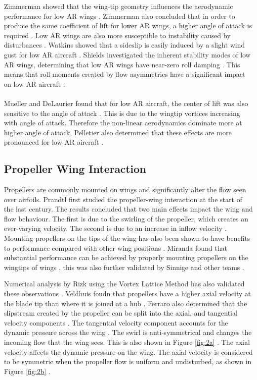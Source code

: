  Zimmerman showed that the wing-tip geometry influences the aerodynamic performance for low AR wings \cite{Zimmerman1936}. Zimmerman also concluded that in order to produce the same coefficient of lift for lower AR wings, a higher angle of attack is required \cite{Zimmerman1936}. Low AR wings are also more susceptible to instability caused by disturbances \cite{DeVoria2017}. Watkins showed that a sideslip is easily induced by a slight wind gust for low AR aircraft \cite{Watkins2012}. Shields investigated the inherent stability modes of low AR wings, determining that low AR wings have near-zero roll damping \cite{Shields2015}. This means that roll moments created by flow asymmetries have a significant impact on low AR aircraft \cite{Shields2015}.\\
 \\
 Mueller and DeLaurier found that for low AR aircraft, the center of lift was also sensitive to the angle of attack \cite{Mueller2003}. This is due to the wingtip vortices increasing with angle of attack. Therefore the non-linear aerodynamics dominate more at higher angle of attack, Pelletier also determined that these effects are more pronounced for low AR aircraft \cite{Pelletier2012}. 


\subsection{Propeller Wing Interaction}




Propellers are commonly mounted on wings and significantly alter the flow seen over airfoils. Prandtl first studied the propeller-wing interaction at the start of the last century. The results concluded that two main effects impact the wing and flow behaviour. The first is due to the swirling of the propeller, which creates an ever-varying velocity. The second is due to an increase in inflow velocity \cite{Pant}. Mounting propellers on the tips of the wing has also been shown to have benefits to performance compared with other wing positions \cite{Miranda1986} . Miranda found that substantial performance can be achieved by properly mounting propellers on the wingtips of wings \cite{Miranda1986}, this was also further validated by Sinnige \cite{Sinnige2019} and other teams \cite{Veldhuis2000} \cite{review}. 

Numerical analysis by Rizk using the Vortex Lattice Method has also validated these observations \cite{Rizk2012}. Veldhuis foudn that propellers have a higher axial velocity at the blade tip than where it is joined at a hub \cite{Veldhuis2000}. Ferraro also determined that the slipstream created by the propeller can be split into the axial, and tangential velocity components \cite{Ferraro2014}. The tangential velocity component accounts for the dynamic pressure across the wing \cite{Ferraro2014}. The swirl is anti-symmetrical and changes the incoming flow that the wing sees. This is also shown in Figure \ref{fig:2a} \cite{Ferraro2014}. The axial velocity affects the dynamic pressure on the wing. The axial velocity is considered to be symmetric when the propeller flow is uniform and undisturbed, as shown in Figure \ref{fig:2b} \cite{Ferraro2014}.


